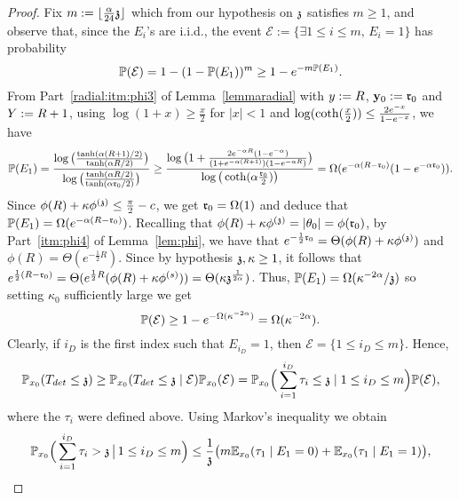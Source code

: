 \begin{proof}
Fix $m:=\lfloor \tfrac{\alpha}{24}\ss\rfloor$ which from our hypothesis on $\ss$ satisfies $m\geq 1$, and observe that, since the $E_i$'s are i.i.d., the event $\mathcal{E}:=\{\exists 1\leq i\leq m,\,E_i=1\}$ has probability
\[%
\PP(\mathcal{E})=1-(1-\PP(E_1))^m\geq 1-e^{-m\PP(E_1)}.
\]
From Part~\eqref{radial:itm:phi3} of Lemma~\ref{lemmaradial} with $\auxy:=R$, $\yabs_0:=\rabs_0$ and $\auxY:=R+1$, using  $\log(1+x)\geq\frac{x}{2}$ for $|x|<1$
and $\log(\cotanh(\frac{x}{2}))\leq \frac{2e^{-x}}{1-e^{-x}}$, we have
\[%
\PP(E_1)=\frac{\log\big(\tfrac{\tanh(\alpha (R+1)/2)}{\tanh(\alpha R/2)}\big)}{\log\big(\tfrac{\tanh(\alpha R/2)}{\tanh(\alpha \rabs_0/2)}\big)}
\geq\frac{\log\big(1+\frac{2e^{-\alpha R}(1-e^{-\alpha})}{(1+e^{-\alpha(R+1)})(1-e^{-\alpha R})}\big)}{\log\big(\cotanh(\alpha\frac{\rabs_0}{2})\big)}
=\Omega(e^{-\alpha(R-\rabs_0)}(1-e^{-\alpha\rabs_0})).
\]
Since $\phi(R)+\kappa\phi^{(\ss)}\leq\frac{\pi}{2}-c$, we get $\rabs_0=\Omega(1)$ and deduce that $\PP(E_1)=\Omega(e^{-\alpha(R-\rabs_0)})$.
Recalling that $\phi(R)+\kappa\phi^{(\ss)}=|\theta_0|=\phi(\rabs_0)$, by Part~\eqref{itm:phi4} of Lemma~\ref{lem:phi}, we have that
$e^{-\frac12\rabs_0}=\Theta(\phi(R)+\kappa\phi^{(\ss)})$ and $\phi(R)=\Theta(e^{-\frac12R})$.
Since by hypothesis $\ss,\kappa\geq 1$, it follows that
$e^{\frac12(R-\rabs_0)}=\Theta(e^{\frac12 R}(\phi(R)+\kappa\phi^{(s)}))=\Theta(\kappa\ss^{\frac{1}{2\alpha}})$.
Thus, $\PP(E_1)=\Omega(\kappa^{-2\alpha}/\ss)$ so setting $\kappa_0$ sufficiently large we get
\begin{equation*}%
\PP(\mathcal{E}) \geq %
1-e^{-\Omega(\kappa^{-2\alpha})}
=\Omega(\kappa^{-2\alpha}).
\end{equation*}
Clearly, if $i_D$ is the first index such that $E_{i_D}=1$, then $\mathcal{E}=\{1\leq i_D\leq m\}$. Hence, 
\[\P_{x_0}(T_{det}\leq \ss)\geq \P_{x_0}(T_{det}\leq \ss\mid\mathcal{E})\P_{x_0}(\mathcal{E})=\P_{x_0}\Big(\sum_{i=1}^{i_D}\tau_i\leq \ss \mid 1\leq i_D\leq m\Big)\PP(\mathcal{E}),\]
where the $\tau_i$ were defined above. Using Markov's inequality we obtain
\[\P_{x_0}\Big(\sum_{i=1}^{i_D}\tau_i> \ss\,\big|\,1\leq i_D\leq m\Big)\leq \frac{1}{\ss}\big(m\EE_{x_0}(\tau_1 \mid E_1=0)+\EE_{x_0}(\tau_1 \mid E_1=1)\big),\]

\end{proof}
